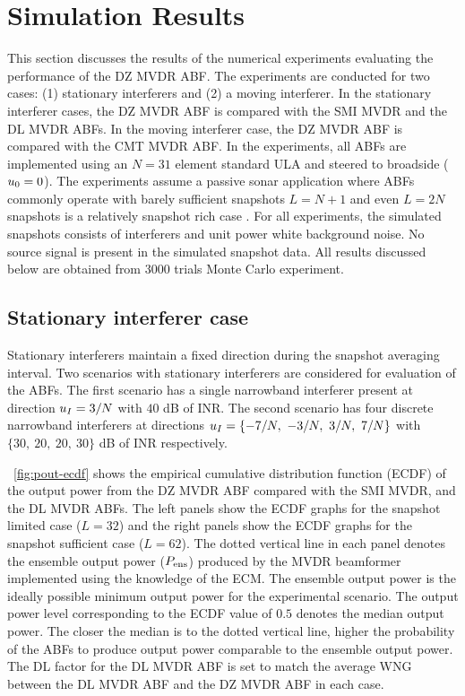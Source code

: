 \section{Simulation Results}
\label{sec:results}
This section discusses the results of the numerical experiments
evaluating the performance of the DZ MVDR ABF. The experiments are
conducted for two cases: (1) stationary interferers and (2) a moving
interferer. In the stationary interferer cases, the DZ MVDR ABF is
compared with the SMI MVDR and the DL MVDR ABFs. In the moving
interferer case, the DZ MVDR ABF is compared with the CMT MVDR ABF.
In the experiments, all ABFs are implemented using an $N = 31$ element
standard ULA and steered to broadside ($u_0 = 0$). The experiments
assume a passive sonar application where ABFs commonly operate with
barely sufficient snapshots $L = N + 1$ and even $L = 2N$ snapshots
is a relatively snapshot rich case
\cite{cox2002adaptive,baggeroer1999passive}. For all experiments, the
simulated snapshots consists of interferers and unit power white
background noise. No source signal is present in the simulated
snapshot data. All results discussed below are obtained from 3000
trials Monte Carlo experiment.

\subsection{Stationary interferer case}
\label{sec:stat-interf}
Stationary interferers maintain a fixed direction during the snapshot
averaging interval. Two scenarios with stationary interferers are
considered for evaluation of the ABFs. The first scenario has a single
narrowband interferer present at direction $u_I = 3/N$ with $40$
dB of INR. The second scenario has four discrete narrowband
interferers at directions $u_I = \{-7/N, ~-3/N, ~3/N, ~7/N \}$
with $\{30, ~20, ~20, ~30 \}$ dB of INR respectively.

\figurename{}~\ref{fig:pout-ecdf} shows the empirical cumulative
distribution function (ECDF) of the output power from the DZ MVDR ABF
compared with the SMI MVDR, and the DL MVDR ABFs. The left panels show
the ECDF graphs for the snapshot limited case ($L = 32$) and the right
panels show the ECDF graphs for the snapshot sufficient case
($L = 62$). The dotted vertical line in each panel denotes the
ensemble output power ($P_{\rm ens}$) produced by the MVDR beamformer
implemented using the knowledge of the ECM. The ensemble output power
is the ideally possible minimum output power for the experimental
scenario. The output power level corresponding to the ECDF value of
$0.5$ denotes the median output power. The closer the median is to the
dotted vertical line, higher the probability of the ABFs to produce
output power comparable to the ensemble output power. The DL factor
for the DL MVDR ABF is set to match the average WNG between the DL
MVDR ABF and the DZ MVDR ABF in each case.


